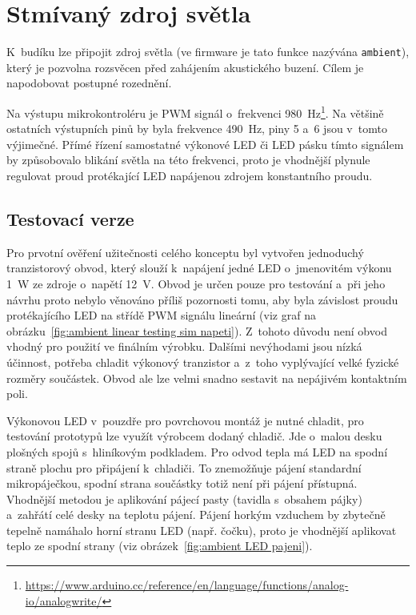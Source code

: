 \section{Stmívaný zdroj světla}
K~budíku lze připojit zdroj světla (ve firmware je tato funkce nazývána
\texttt{ambient}), který je pozvolna rozsvěcen před zahájením akustického
buzení. Cílem je napodobovat postupné rozednění.

Na výstupu  mikrokontroléru je PWM signál o~frekvenci
\SI{980}{\hertz}\footnote{\url{https://www.arduino.cc/reference/en/language/functions/analog-io/analogwrite/}}.
Na většině ostatních výstupních pinů by byla frekvence \SI{490}{\hertz}, piny 5
a~6 jsou v~tomto výjimečné. %
Přímé řízení samostatné výkonové LED či LED pásku tímto signálem by způsobovalo
blikání světla na této frekvenci, proto je vhodnější plynule regulovat proud
protékající LED napájenou zdrojem konstantního proudu.


\subsection{Testovací verze}
Pro prvotní ověření užitečnosti celého konceptu byl vytvořen jednoduchý
tranzistorový obvod, který slouží k~napájení jedné LED o~jmenovitém výkonu
\SI{1}{\watt} ze zdroje o~napětí \SI{12}{\volt}. Obvod je určen pouze pro
testování a~při jeho návrhu proto nebylo věnováno příliš pozornosti tomu, aby
byla závislost proudu protékajícího LED na střídě PWM signálu lineární (viz
graf na obrázku~\vref{fig:ambient linear testing sim napeti}).
Z~tohoto důvodu není obvod vhodný pro použití ve finálním výrobku. Dalšími
nevýhodami jsou nízká účinnost, potřeba chladit výkonový tranzistor a~z~toho
vyplývající velké fyzické rozměry součástek. Obvod ale lze velmi snadno
sestavit na nepájivém kontaktním poli.

Výkonovou LED v~pouzdře pro povrchovou montáž je nutné chladit, pro testování
prototypů lze využít výrobcem dodaný chladič. Jde o~malou desku plošných spojů
s~hliníkovým podkladem. Pro odvod tepla má LED na spodní straně plochu pro
připájení k~chladiči. To znemožňuje pájení standardní mikropáječkou, spodní
strana součástky totiž není při pájení přístupná. Vhodnější metodou je
aplikování pájecí pasty (tavidla s~obsahem pájky) a~zahřátí celé desky na
teplotu pájení. Pájení horkým vzduchem by zbytečně tepelně namáhalo horní
stranu LED (např. čočku), proto je vhodnější aplikovat teplo ze spodní strany
(viz obrázek~\vref{fig:ambient LED pajeni}).

